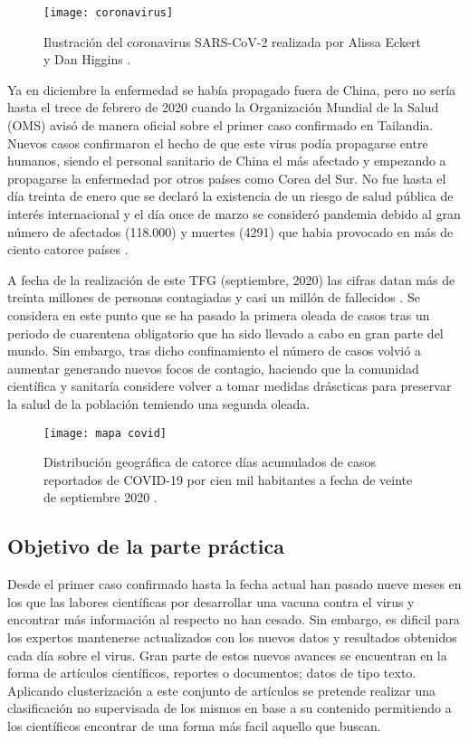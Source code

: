 \documentclass[10pt, a4paper]{article}
\begin{document}
\begin{figure}[ht]
\centering
\texttt{[image: coronavirus]}
\caption{Ilustración del coronavirus SARS-CoV-2 realizada por Alissa Eckert y Dan Higgins \cite{coronavirus imagen}.}
\label{fig:coronavirus}
\end{figure}

Ya en diciembre la enfermedad se había propagado fuera de China, pero no sería hasta el trece de febrero de 2020 cuando la Organización Mundial de la Salud (OMS) avisó de manera oficial sobre el primer caso confirmado en Tailandia. Nuevos casos confirmaron el hecho de que este virus podía propagarse entre humanos, siendo el personal sanitario de China el más afectado y empezando a propagarse la enfermedad por otros países como Corea del Sur. No fue hasta el día treinta de enero que se declaró la existencia de un riesgo de salud pública de interés internacional y el día once de marzo se consideró pandemia debido al gran número de afectados (118.000) y muertes (4291) que habia provocado en más de ciento catorce países \cite{mas coronavirus}.

A fecha de la realización de este TFG (septiembre, 2020) las cifras datan más de treinta millones de personas contagiadas y casi un millón de fallecidos \cite{mas mas coronavirus}. Se considera en este punto que se ha pasado la primera oleada de casos tras un periodo de cuarentena obligatorio que ha sido llevado a cabo en gran parte del mundo. Sin embargo, tras dicho confinamiento el número de casos volvió a aumentar generando nuevos focos de contagio, haciendo que la comunidad científica y sanitaría considere volver a tomar medidas dráscticas para preservar la salud de la población temiendo una segunda oleada. 

\begin{figure}[ht]
\centering
\texttt{[image: mapa covid]}
\caption{Distribución geográfica de catorce días acumulados de casos reportados de COVID-19 por cien mil habitantes a fecha de veinte de septiembre 2020 \cite{coronavirus mapa}.}
\label{fig:mapa covid}
\end{figure}

\subsection{Objetivo de la parte práctica}

Desde el primer caso confirmado hasta la fecha actual han pasado nueve meses en los que las labores científicas por desarrollar una vacuna contra el virus y encontrar más información al respecto no han cesado. Sin embargo, es dificil para los expertos mantenerse actualizados con los nuevos datos y resultados obtenidos cada día sobre el virus. Gran parte de estos nuevos avances se encuentran en la forma de artículos científicos, reportes o documentos; datos de tipo texto. Aplicando clusterización a este conjunto de artículos se pretende realizar una clasificación no supervisada de los mismos en base a su contenido permitiendo a los científicos encontrar de una forma más facil aquello que buscan.
\end{document}
